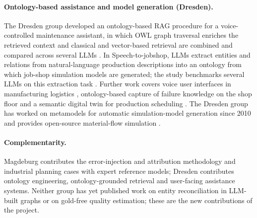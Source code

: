 \paragraph{Ontology-based assistance and model generation (Dresden).}
The Dresden group developed an ontology-based \ac{RAG} procedure for a voice-controlled maintenance assistant, in which \ac{OWL} graph traversal enriches the retrieved context and classical and vector-based retrieval are combined and compared across several \acp{LLM} \parencite{ludwig2025ontology}. In Speech-to-jobshop, \acp{LLM} extract entities and relations from natural-language production descriptions into an ontology from which job-shop simulation models are generated; the study benchmarks several \acp{LLM} on this extraction task \parencite{ludwig2024speech}. Further work covers voice user interfaces in manufacturing logistics \parencite{ludwig2023voice}, ontology-based capture of failure knowledge on the shop floor \parencite{scharfe2024failure} and a semantic digital twin for production scheduling \parencite{kosse2024semantic}. The Dresden group has worked on metamodels for automatic simulation-model generation since 2010 \parencite{rehm2010metamodell} and provides open-source material-flow simulation \parencite{betker2026craneflow}.

\paragraph{Complementarity.}
Magdeburg contributes the error-injection and attribution methodology and industrial planning cases with expert reference models; Dresden contributes ontology engineering, ontology-grounded retrieval and user-facing assistance systems. Neither group has yet published work on entity reconciliation in \ac{LLM}-built graphs or on gold-free quality estimation; these are the new contributions of the project.
